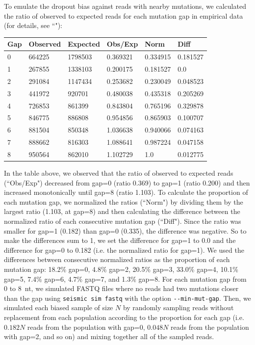 \documentclass[unnumsec,webpdf,contemporary,large]{oup-authoring-template}%
\theoremstyle{thmstyleone}%
\theoremstyle{thmstyletwo}%
\theoremstyle{thmstylethree}%
\begin{document}
To emulate the dropout bias against reads with nearby mutations, we calculated the ratio of observed to expected reads for each mutation gap in empirical data (for details, see ``"):

\begin{table}[h]
\centering
\begin{tabular}{llllll}
\hline
Gap & Observed & Expected & Obs/Exp & Norm & Diff \\
\hline
0 & 664225 & 1798503 & 0.369321 & 0.334915 & 0.181527 \\
1 & 267855 & 1338103 & 0.200175 & 0.181527 & 0.0 \\
2 & 291084 & 1147434 & 0.253682 & 0.230049 & 0.048523 \\
3 & 441972 & 920701 & 0.480038 & 0.435318 & 0.205269 \\
4 & 726853 & 861399 & 0.843804 & 0.765196 & 0.329878 \\
5 & 846775 & 886808 & 0.954856 & 0.865903 & 0.100707 \\
6 & 881504 & 850348 & 1.036638 & 0.940066 & 0.074163 \\
7 & 888662 & 816303 & 1.088641 & 0.987224 & 0.047158 \\
8 & 950564 & 862010 & 1.102729 & 1.0 & 0.012775 \\
\hline
\end{tabular}
\end{table}

In the table above, we observed that the ratio of observed to expected reads (``Obs/Exp") decreased from gap=0 (ratio 0.369) to gap=1 (ratio 0.200) and then increased monotonically until gap=8 (ratio 1.103).
To calculate the proportion of each mutation gap, we normalized the ratios (``Norm") by dividing them by the largest ratio (1.103, at gap=8) and then calculating the difference between the normalized ratio of each consecutive mutation gap (``Diff").
Since the ratio was smaller for gap=1 (0.182) than gap=0 (0.335), the difference was negative.
So to make the differences sum to 1, we set the difference for gap=1 to 0.0 and the difference for gap=0 to 0.182 (i.e. the normalized ratio for gap=1).
We used the differences between consecutive normalized ratios as the proportion of each mutation gap: 18.2\% gap=0, 4.8\% gap=2, 20.5\% gap=3, 33.0\% gap=4, 10.1\% gap=5, 7.4\% gap=6, 4.7\% gap=7, and 1.3\% gap=8.
For each mutation gap from 0 to 8~nt, we simulated FASTQ files where no reads had two mutations closer than the gap using \verb|seismic sim fastq| with the option \verb|--min-mut-gap|.
Then, we simulated each biased sample of size $N$ by randomly sampling reads without replacement from each population according to the proportion for each gap (i.e. $0.182N$ reads from the population with gap=0, $0.048N$ reads from the population with gap=2, and so on) and mixing together all of the sampled reads.
\end{document}
